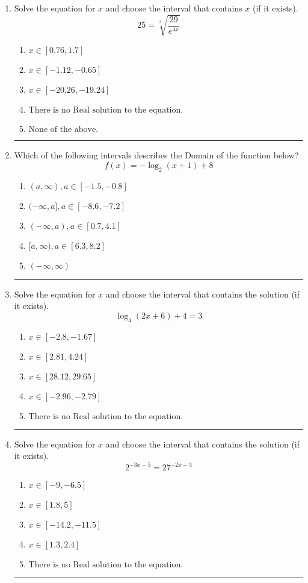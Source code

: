 \documentclass[14pt]{extbook}
\newcommand{\litem}[1]{\item#1\hspace*{-1cm}\rule{\textwidth}{0.4pt}}
\begin{document}
\begin{enumerate}
{\begin{enumerate}[label=\Alph*.]
\end{enumerate} }
\litem{
 Solve the equation for $x$ and choose the interval that contains $x$ (if it exists).\[  25 = \sqrt[3]{\frac{29}{e^{4x}}} \]\begin{enumerate}[label=\Alph*.]
\item \( x \in [0.76, 1.7] \)
\item \( x \in [-1.12, -0.65] \)
\item \( x \in [-20.26, -19.24] \)
\item \( \text{There is no Real solution to the equation.} \)
\item \( \text{None of the above.} \)

\end{enumerate} }
\litem{
Which of the following intervals describes the Domain of the function below?\[ f(x) = -\log_2{(x+1)}+8 \]\begin{enumerate}[label=\Alph*.]
\item \( (a, \infty), a \in [-1.5, -0.8] \)
\item \( (-\infty, a], a \in [-8.6, -7.2] \)
\item \( (-\infty, a), a \in [0.7, 4.1] \)
\item \( [a, \infty), a \in [6.3, 8.2] \)
\item \( (-\infty, \infty) \)

\end{enumerate} }
\litem{
Solve the equation for $x$ and choose the interval that contains the solution (if it exists).\[ \log_{4}{(2x+6)}+4 = 3 \]\begin{enumerate}[label=\Alph*.]
\item \( x \in [-2.8, -1.67] \)
\item \( x \in [2.81, 4.24] \)
\item \( x \in [28.12, 29.65] \)
\item \( x \in [-2.96, -2.79] \)
\item \( \text{There is no Real solution to the equation.} \)

\end{enumerate} }
\litem{
Solve the equation for $x$ and choose the interval that contains the solution (if it exists).\[ 2^{-3x-5} = 27^{-2x+3} \]\begin{enumerate}[label=\Alph*.]
\item \( x \in [-9, -6.5] \)
\item \( x \in [1.8, 5] \)
\item \( x \in [-14.2, -11.5] \)
\item \( x \in [1.3, 2.4] \)
\item \( \text{There is no Real solution to the equation.} \)


\end{enumerate}}
\end{enumerate}
\end{document}
